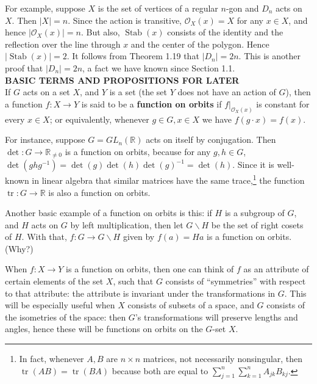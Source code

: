 \documentclass[leqno]{book}
\begin{document}
\noindent For example, suppose $X$ is the set of vertices of a regular $n$-gon and $D_n$ acts on $X$.  Then $|X|=n$.  Since the action is transitive, $\mathcal O_X(x)=X$ for any $x\in X$, and hence $|\mathcal O_X(x)|=n$.  But also, $\operatorname{Stab}(x)$ consists of the identity and the reflection over the line through $x$ and the center of the polygon.  Hence $|\operatorname{Stab}(x)|=2$.  It follows from Theorem 1.19 that $|D_n|=2n$.  This is another proof that $|D_n|=2n$, a fact we have known since Section 1.1.\\

\noindent\textbf{BASIC TERMS AND PROPOSITIONS FOR LATER}\\

\noindent If $G$ acts on a set $X$, and $Y$ is a set (the set $Y$ does not have an action of $G$), then a function $f:X\to Y$ is said to be a \textbf{function on orbits} if $f|_{\mathcal O_X(x)}$ is constant for every $x\in X$; or equivalently, whenever $g\in G,x\in X$ we have $f(g\cdot x)=f(x)$.

For instance, suppose $G=GL_n(\mathbb R)$ acts on itself by conjugation.  Then $\det:G\to\mathbb R_{\ne 0}$ is a function on orbits, because for any $g,h\in G$, $\det(ghg^{-1})=\det(g)\det(h)\det(g)^{-1}=\det(h)$.  Since it is well-known in linear algebra that similar matrices have the same trace,\footnote{In fact, whenever $A,B$ are $n\times n$ matrices, not necessarily nonsingular, then $\operatorname{tr}(AB)=\operatorname{tr}(BA)$ because both are equal to $\sum_{j=1}^n\sum_{k=1}^nA_{jk}B_{kj}$.} the function $\operatorname{tr}:G\to\mathbb R$ is also a function on orbits.

Another basic example of a function on orbits is this: if $H$ is a subgroup of $G$, and $H$ acts on $G$ by left multiplication, then let $G\backslash H$ be the set of right cosets of $H$.  With that, $f:G\to G\backslash H$ given by $f(a)=Ha$ is a function on orbits.  (Why?) %

When $f:X\to Y$ is a function on orbits, then one can think of $f$ as an attribute of certain elements of the set $X$, such that $G$ consists of ``symmetries'' with respect to that attribute: the attribute is invariant under the transformations in $G$.  This will be especially useful when $X$ consists of subsets of a space, and $G$ consists of the isometries of the space: then $G$'s transformations will preserve lengths and angles, hence these will be functions on orbits on the $G$-set $X$.
\end{document}

